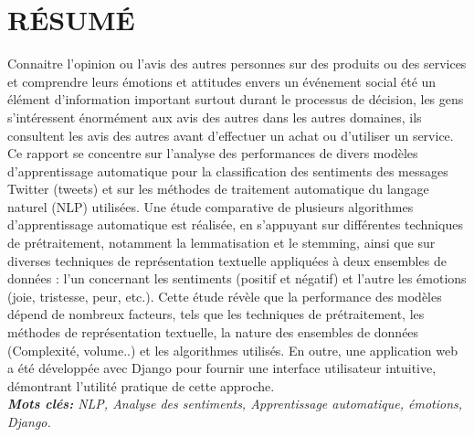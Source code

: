 \newpage
\chapter*{RÉSUMÉ}

Connaitre l'opinion ou l'avis des autres personnes sur des produits ou des services et comprendre leurs émotions et attitudes envers un événement social été un élément d'information important surtout durant le processus de décision, les gens s'intéressent énormément aux avis des autres dans les autres domaines, ils consultent les avis des autres avant d'effectuer un achat ou d'utiliser un service.\\
Ce rapport se concentre sur l'analyse des performances de divers modèles d'apprentissage automatique pour la classification des sentiments des messages Twitter (tweets) et sur les méthodes de traitement automatique du langage naturel (NLP) utilisées. Une étude comparative de plusieurs algorithmes d'apprentissage automatique est réalisée, en s'appuyant sur différentes techniques de prétraitement, notamment la lemmatisation et le stemming, ainsi que sur diverses techniques de représentation textuelle appliquées à deux ensembles de données : l'un concernant les sentiments (positif et négatif) et l'autre les émotions (joie, tristesse, peur, etc.). Cette étude révèle que la performance des modèles dépend de nombreux facteurs, tels que les techniques de prétraitement, les méthodes de représentation textuelle, la nature des ensembles de données (Complexité, volume..) et les algorithmes utilisés. En outre, une application web a été développée avec Django pour fournir une interface utilisateur intuitive, démontrant l'utilité pratique de cette approche.
\\
\emph{{\textbf{Mots clés:}} NLP, Analyse des sentiments, Apprentissage automatique, émotions, Django.}


